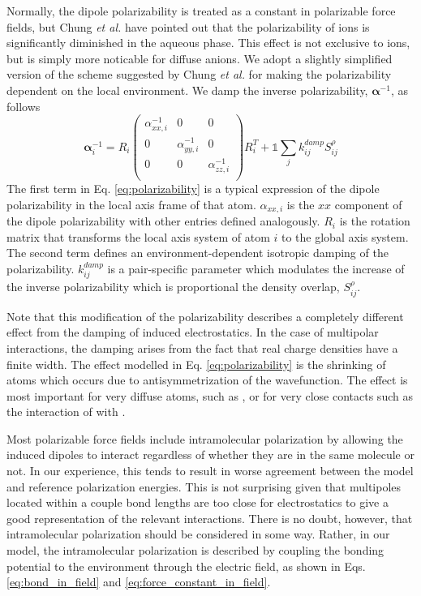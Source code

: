 \documentclass[journal=jacsat,manuscript=article]{achemso}
\begin{document}
Normally, the dipole polarizability is treated as a constant in polarizable force fields, but Chung \textit{et al.} have pointed out that the polarizability of ions is significantly diminished in the aqueous phase.\cite{chung2022classical} This effect is not exclusive to ions, but is simply more noticable for diffuse anions. We adopt a slightly simplified version of the scheme suggested by Chung \textit{et al.} for making the polarizability dependent on the local environment. We damp the inverse polarizability, $\bm{\alpha}^{-1}$, as follows
\begin{equation}
  \bm{\alpha}^{-1}_i=
  R_i\begin{pmatrix}
    \alpha^{-1}_{xx,i} & 0 & 0 \\
    0 & \alpha^{-1}_{yy,i} & 0 \\
    0 & 0 & \alpha^{-1}_{zz,i} \\
  \end{pmatrix}R_i^T
    +\mathds{1}\sum_{j}k^{damp}_{ij}S_{ij}^\rho
    \label{eq:polarizability}
\end{equation}
\noindent
The first term in Eq. \ref{eq:polarizability} is a typical expression of the dipole polarizability in the local axis frame of that atom. $\alpha_{xx,i}$ is the $xx$ component of the dipole polarizability with other entries defined analogously. $R_i$ is the rotation matrix that transforms the local axis system of atom $i$ to the global axis system. The second term defines an environment-dependent isotropic damping of the polarizability. $k_{ij}^{damp}$ is a pair-specific parameter which modulates the increase of the inverse polarizability which is proportional the density overlap, $S_{ij}^\rho$.

Note that this modification of the polarizability describes a completely different effect from the damping of induced electrostatics. In the case of multipolar interactions, the damping arises from the fact that real charge densities have a finite width. The effect modelled in Eq. \ref{eq:polarizability} is the shrinking of atoms which occurs due to antisymmetrization of the wavefunction. The effect is most important for very diffuse atoms, such as , or for very close contacts such as the interaction of  with .

Most polarizable force fields include intramolecular polarization by allowing the induced dipoles to interact regardless of whether they are in the same molecule or not. In our experience, this tends to result in worse agreement between the model and reference polarization energies. This is not surprising given that multipoles located within a couple bond lengths are too close for electrostatics to give a good representation of the relevant interactions. There is no doubt, however, that intramolecular polarization should be considered in some way. Rather, in our model, the intramolecular polarization is described by coupling the bonding potential to the environment through the electric field, as shown in Eqs. \ref{eq:bond_in_field} and \ref{eq:force_constant_in_field}.
\end{document}
